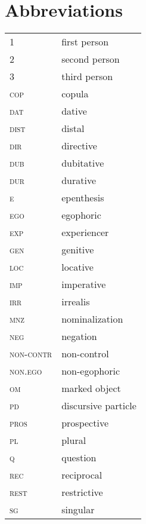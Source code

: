 \documentclass[output=paper]{langsci/langscibook}
\begin{document}
\section*{Abbreviations}
\begin{tabularx}{.45\textwidth}{lQ}
1 & first person\\
2 & second person\\ 
3 & third person\\ 
\textsc{cop} & copula\\ 
\textsc{dat} & dative\\ 
\textsc{dist} & distal\\ 
\textsc{dir} & directive\\ 
\textsc{dub} & dubitative\\ 
\textsc{dur} & durative\\ 
\textsc{e} & epenthesis\\  
\textsc{ego} & egophoric\\ 
\textsc{exp} & experiencer\\ 
\textsc{gen} & genitive\\ 
\textsc{loc} & locative\\ 
\textsc{imp} & imperative\\ 
\textsc{irr} & irrealis\\ 
\textsc{mnz} & nominalization\\ 
\textsc{neg} & negation\\ 
\textsc{non-contr} & non-control\\ 
\textsc{non.ego} & non-egophoric\\ 
\textsc{om} & marked object\\ 
\textsc{pd} & discursive particle\\ 
\textsc{pros} & prospective\\ 
\textsc{pl} & plural\\ 
\textsc{q} & question\\ 
\textsc{rec} & reciprocal\\ 
\textsc{rest} & restrictive\\ 
\textsc{sg} & singular\\
\end{tabularx}

\end{document}
